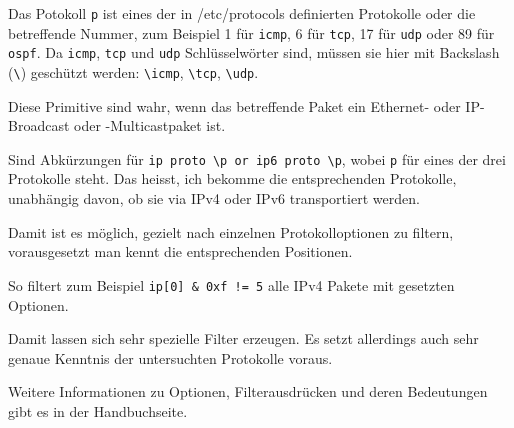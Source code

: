\begin{normaltext}
\begin{description}
      Das Potokoll \verb?p? ist eines der in /etc/protocols definierten
      Protokolle oder die betreffende Nummer, zum Beispiel 1 für \verb?icmp?,
      6 für \verb?tcp?, 17 für \verb?udp? oder 89 für \verb?ospf?. Da
      \verb?icmp?, \verb?tcp? und \verb?udp? Schlüsselwörter sind, müssen sie
      hier mit Backslash (\verb?\?) geschützt werden: \verb?\icmp?,
      \verb?\tcp?, \verb?\udp?.
    \item[ether broadcast]
    \item[ip broadcast]
    \item[ether multicast]
    \item[ip multicast]
      Diese Primitive sind wahr, wenn das betreffende Paket ein Ethernet- oder
      IP-Broadcast oder -Multicastpaket ist.
    \item[icmp | tcp | udp]
      Sind Abkürzungen für \verb?ip proto \p or ip6 proto \p?, wobei \verb?p?
      für eines der drei Protokolle steht. Das heisst, ich bekomme die
      entsprechenden Protokolle, unabhängig davon, ob sie via IPv4 oder IPv6
      transportiert werden.
    \item[expr relop expr]
      Damit ist es möglich, gezielt nach einzelnen Protokolloptionen zu
      filtern, vorausgesetzt man kennt die entsprechenden Positionen.

      So filtert zum Beispiel \verb?ip[0] & 0xf != 5? alle IPv4 Pakete mit
      gesetzten Optionen.

      Damit lassen sich sehr spezielle Filter erzeugen. Es setzt allerdings
      auch sehr genaue Kenntnis der untersuchten Protokolle voraus.
  \end{description}

  Weitere Informationen zu Optionen, Filterausdrücken und deren Bedeutungen
  gibt es in der Handbuchseite.
\end{normaltext}



